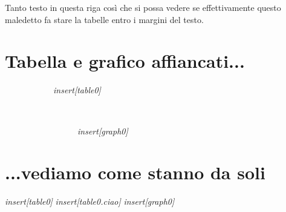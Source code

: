 \documentclass[a4paper, 10pt]{article}
\newcommand{\SRE}[1]{\textit{insert[#1]}}
\begin{document}
Tanto testo in questa riga così che si possa vedere se effettivamente questo maledetto fa stare la tabelle entro i margini del testo.

\tabulinesep=1.5mm

\section*{Tabella e grafico affiancati...}
\begin{figure}[h!]
  \begin{subfigure}[cm]{0.5\linewidth}
    \SRE{table0}
  \end{subfigure}
  ~
  \begin{subfigure}[cm]{0.5\linewidth}    
    \begin{subfigure}[cm]{\linewidth}
      \SRE{graph0}
    \end{subfigure}
  \end{subfigure}
\end{figure}

\pagebreak

\section*{...vediamo come stanno da soli}
\centering \SRE{table0}
\centering \SRE{table0.ciao}
\centering \SRE{graph0}
\end{document}
